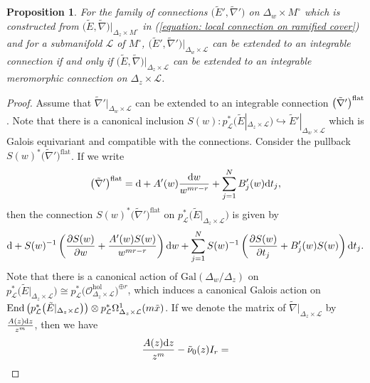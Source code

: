 \documentclass[pdftex]{sigma}
\numberwithin{equation}{section}
\newtheorem{Proposition}[Theorem]{Proposition}
\newcommand\End{\mathop{\rm End}\nolimits}
\begin{document}
\begin{Proposition}\label{proposition: ramified local generalized isomonodromic deformation}
For the family of connections $\big(\tilde{E}',\tilde{\nabla}'\big)$ on $\Delta_w\times M^{\circ}$
which is constructed from $\big(\tilde{E},\tilde{\nabla}\big)|_{\Delta_z\times M^{\circ}}$
in (\ref{equation: local connection on ramified cover})
and for a submanifold ${\mathcal L}$ of $M^{\circ}$,
$\big(\tilde{E}',\tilde{\nabla}'\big)|_{\Delta_w\times{\mathcal L}}$
can be extended to an integrable connection if and only if
$\big(\tilde{E},\tilde{\nabla}\big)|_{\Delta_z\times{\mathcal L}}$
can be extended to an integrable meromorphic connection on $\Delta_z\times{\mathcal L}$.
\end{Proposition}

\begin{proof}
Assume that $\tilde{\nabla}'|_{\Delta_w\times{\mathcal L}}$
can be extended to an integrable connection
$\big(\tilde{\nabla}'\big)^{\rm flat}$.
Note that there is a canonical inclusion
$S(w)\colon p_{\mathcal L}^*\big(\tilde{E}|_{\Delta_z\times{\mathcal L}}\big)\hookrightarrow
\tilde{E}'|_{\Delta_w\times{\mathcal L}}$
which is Galois equivariant and compatible with the connections.
Consider the pullback
$S(w)^*\big(\tilde{\nabla}'\big)^{\mathrm{flat}}$.
If we write
\[
 \big(\tilde{\nabla}'\big)^{\mathrm{flat}}
 =
 {\rm d}+A'(w)\frac{{\rm d}w}{w^{mr-r}}
 +\sum_{j=1}^N B'_j(w){\rm d}t_j,
\]
then the connection $S(w)^*\big(\tilde{\nabla}'\big)^{\mathrm{flat}}$
on $p_{\mathcal L}^*\big(\tilde{E}|_{\Delta_z\times{\mathcal L}}\big)$ is given by
\begin{equation}
\label{equation: matrix of integrable connection to be descend}
 {\rm d}+S(w)^{-1}\left( \frac{\partial S(w)}{\partial w}+\frac{A'(w)S(w)}{w^{mr-r}}\right){\rm d}w
 +\sum_{j=1}^N S(w)^{-1} \left(\frac {\partial S(w)} {\partial t_j}+B'_j(w)S(w) \right){\rm d}t_j.
\end{equation}
Note that there is a canonical action of
$\mathrm{Gal}(\Delta_w/\Delta_z)$ on
$p_{\mathcal L}^*\big(\tilde{E}|_{\Delta_z\times{\mathcal L}}\big)\cong
p_{\mathcal L}^*\big({\mathcal O}^{\mathrm{hol}}_{\Delta_z\times{\mathcal L}}\big)^{\oplus r}$,
which induces a canonical Galois action on
$\End\big(p_{\mathcal L}^*\big(\tilde{E}|_{\Delta_z\times{\mathcal L}}\big)\big)\otimes
p_{\mathcal L}^*\Omega^1_{\Delta_z\times{\mathcal L}}(m\tilde{x})$.
If we denote the matrix of $\tilde{\nabla}|_{\Delta_z\times{\mathcal L}}$
by $\frac{A(z){\rm d}z}{z^m}$, then we have
\[
 \frac{A(z){\rm d}z}{z^m}-\tilde{\nu}_0(z)I_r=
\]
\end{proof}
\end{document}
